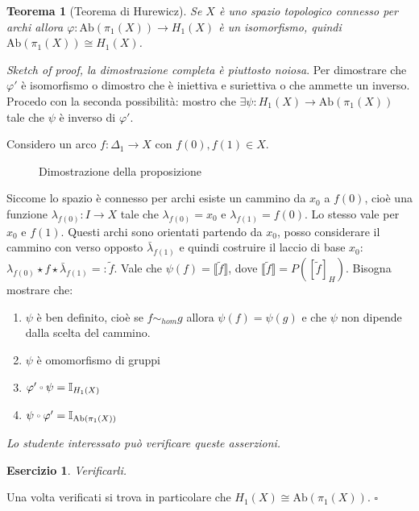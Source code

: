 \documentclass[10pt, twoside=false, x11names]{scrbook}
\newtheorem{theorem}{Teorema}[section]
\newcounter{exercises}
\newtheorem{exercise}[exercises]{Esercizio}
\newenvironment{proof}{{\textbf{Dimostrazione}:}}{\hfill $\square$}
\newcommand{\Id}[1][]{\mathbb{I}_#1}
\newcommand{\Ab}[1]{\mathrm{Ab}\left( #1 \right)}
\let\latexcirc=\circ
\newcommand{\ccirc}{\mathbin{\mathchoice
  {\xcirc\scriptstyle}
  {\xcirc\scriptstyle}
  {\xcirc\scriptscriptstyle}
  {\xcirc\scriptscriptstyle}
}}
\newcommand{\xcirc}[1]{\vcenter{\hbox{$#1\latexcirc$}}}
\let\circ\ccirc
\let\phi\varphi
\begin{document}
\begin{theorem}[Teorema di Hurewicz]
  Se $ X $ è uno spazio topologico
  connesso per archi allora  $ \phi \colon \Ab{\pi_1(X)} \to H_1(X) $
  è un isomorfismo, quindi $ \Ab{\pi_1(X)} \cong H_1(X) $.
\end{theorem}
\begin{proof}
  \emph{Sketch of proof, la dimostrazione completa è piuttosto noiosa}.
  Per dimostrare che $ \phi' $ è isomorfismo o dimostro che è iniettiva e suriettiva
  o che ammette un inverso. Procedo con la seconda possibilità: mostro che
  $ \exists \psi \colon H_1(X) \to \Ab{\pi_1(X)} $ tale che $ \psi $ è inverso di $ \phi' $.

  Considero un arco $ f \colon \Delta_1 \to X $ con $ f(0), f(1) \in X $.
  \begin{figure}[htbp]
    \centering
    \caption{Dimostrazione della proposizione}
    \label{fig:lez3:sketch_of_proof}
  \end{figure}
  Siccome lo spazio è connesso per archi esiste un cammino da $ x_0 $ a $ f(0) $, cioè
  una funzione $ \lambda_{f(0)} \colon I \to X $ tale che $ \lambda_{f(0)} = x_0 $ e $ \lambda_{f(1)} = f(0) $.
  Lo stesso vale per $ x_0 $ e $ f(1) $. Questi archi sono orientati partendo da $ x_0 $, posso
  considerare il cammino con verso opposto $ \bar{\lambda}_{f(1)} $ e quindi costruire il laccio
  di base $ x_0 $: $ \lambda_{f(0)} \star f \star \bar{\lambda}_{f(1)} =: \tilde{f} $. Vale che $
  \psi(f) = \llbracket \tilde{f} \rrbracket $,
  dove $  \llbracket \tilde{f} \rrbracket = P \left([\tilde{f}]_H\right)$.
  Bisogna mostrare che:
  \begin{enumerate}
  \item $ \psi $ è ben definito, cioè se $ f \sim_{hom} g $ allora $ \psi(f) = \psi(g) $ e che $ \psi $
    non dipende dalla scelta del cammino.
  \item $ \psi $ è omomorfismo di gruppi
  \item $ \phi' \circ \psi = \Id{H_1(X)} $
  \item $ \psi \circ \phi' = \Id{\Ab{\pi_1(X)}} $
  \end{enumerate}
  \emph{Lo studente interessato può verificare queste asserzioni.}
  \begin{exercise}
    Verificarli.
  \end{exercise}
  Una volta verificati si trova in particolare che $ H_1(X) \cong \Ab{\pi_1(X)} $.
\end{proof}
\end{document}
